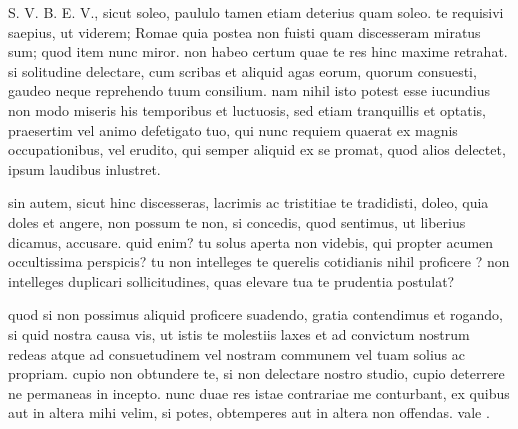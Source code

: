 


 S. V. B. E. V., sicut soleo, paululo tamen etiam deterius quam soleo. te requisivi saepius, ut viderem; Romae quia postea non fuisti quam discesseram miratus sum; quod item nunc miror. non habeo certum quae te res hinc maxime retrahat. si solitudine delectare, cum scribas et aliquid agas eorum, quorum consuesti, gaudeo neque reprehendo tuum consilium. nam nihil isto potest esse iucundius non modo miseris his temporibus et luctuosis, sed etiam tranquillis et optatis, praesertim vel animo defetigato tuo, qui nunc requiem quaerat ex magnis occupationibus, vel erudito, qui semper aliquid ex se promat, quod alios delectet, ipsum laudibus inlustret.

 sin autem, sicut hinc discesseras, lacrimis ac tristitiae te tradidisti, doleo, quia doles et angere, non possum te non, si concedis, quod sentimus, ut liberius dicamus, accusare. quid enim? tu solus aperta non videbis, qui propter acumen occultissima perspicis? tu non intelleges te querelis cotidianis nihil proficere ? non intelleges duplicari sollicitudines, quas elevare tua te prudentia postulat?

 quod si non possimus aliquid proficere suadendo, gratia contendimus et rogando, si quid nostra causa vis, ut istis te molestiis laxes et ad convictum nostrum redeas atque ad consuetudinem vel nostram communem vel tuam solius ac propriam. cupio non obtundere te, si non delectare nostro studio, cupio deterrere ne permaneas in incepto. nunc duae res istae contrariae me conturbant, ex quibus aut in altera mihi velim, si potes, obtemperes aut in altera non offendas. vale .
